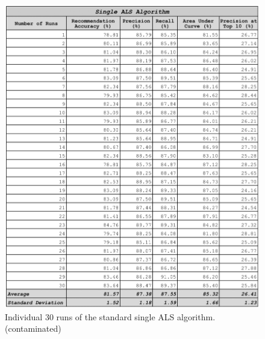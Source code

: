 \begin{figure}
\centering
\includegraphics[scale=0.3]{images/single_als_30_runs.png}
\caption{Individual 30 runs of the standard single ALS algorithm. (contaminated)}
\label{fig:single_algorithm}
\end{figure}

